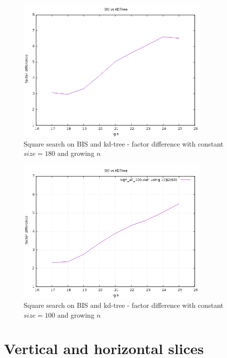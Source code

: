 \begin{figure}[h]
    \centering
    \includegraphics[width = 0.85\textwidth]{pictures/analysis/factor_difference_sqrtn_180.png}
    \caption{Square search on BIS and kd-tree - factor difference with constant $size = 180$ and growing $n$}\label{fig:factdiffsqrt180}
\end{figure}

\begin{figure}[h]
    \centering
    \includegraphics[width = 0.85\textwidth]{pictures/analysis/factor_difference_sqrtn_100.png}
    \caption{Square search on BIS and kd-tree - factor difference with constant $size = 100$ and growing $n$}\label{fig:factdiffsqrt100}
\end{figure}

\clearpage


\section{Vertical and horizontal slices}

